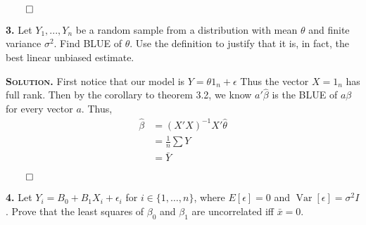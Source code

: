 \documentclass{article}
\newcommand{\Var}{\operatorname{Var}} %
\begin{document}
 \begin{flushright}
\(\qed\)
\end{flushright} 

 
\newpage
 \textbf{3.} Let \(Y_1, ..., Y_n\) be a random sample from a distribution with mean \(\theta\) and finite variance \(\sigma^2\). Find BLUE of \(\theta\). Use the definition to justify that it is, in fact, the best linear unbiased estimate. 
 
 \vspace{4mm} 
\textbf{\textsc{Solution.} }First notice that our model is \(Y = \theta 1_n + \epsilon\) Thus the vector \(X =1_n\) has full rank. Then by the corollary to theorem 3.2, we know \(a'\hat \beta\) is the BLUE of \(a\beta\) for every vector \(a\). Thus, 
\begin{align*}
\hat \beta &= (X'X)^{-1} X' \hat \theta \\
&= \frac1n\sum Y \\
&= \bar Y
\end{align*}
 
  \begin{flushright}
\(\qed\)
\end{flushright} 


\newpage
 \textbf{4.} Let \(Y_i = B_0 + B_1X_i + \epsilon_i \) for \( i \in \{1,\ldots, n\}\), where \(E[\epsilon]=0\) and \(\Var[\epsilon]=\sigma^2 I\). Prove that the least squares of \(\beta_0\) and \(\beta_1 \) are uncorrelated iff \(\bar x = 0\). 
\end{document}
